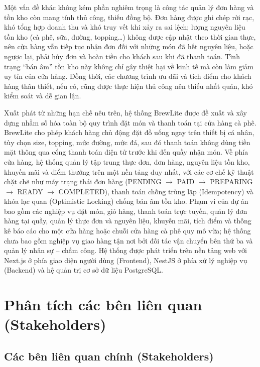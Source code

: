 \documentclass[12pt,a4paper]{report}
\begin{document}
Một vấn đề khác không kém phần nghiêm trọng là công tác quản lý đơn hàng và tồn kho còn mang tính thủ công, thiếu đồng bộ. Đơn hàng được ghi chép rời rạc, khó tổng hợp doanh thu và khó truy vết khi xảy ra sai lệch; lượng nguyên liệu tồn kho (cà phê, sữa, đường, topping\dots{}) không được cập nhật theo thời gian thực, nên cửa hàng vẫn tiếp tục nhận đơn đối với những món đã hết nguyên liệu, hoặc ngược lại, phải hủy đơn và hoàn tiền cho khách sau khi đã thanh toán. Tình trạng ``bán âm'' tồn kho này không chỉ gây thiệt hại về kinh tế mà còn làm giảm uy tín của cửa hàng. Đồng thời, các chương trình ưu đãi và tích điểm cho khách hàng thân thiết, nếu có, cũng được thực hiện thủ công nên thiếu nhất quán, khó kiểm soát và dễ gian lận.

Xuất phát từ những hạn chế nêu trên, hệ thống BrewLite được đề xuất và xây dựng nhằm số hóa toàn bộ quy trình đặt món và thanh toán tại cửa hàng cà phê. BrewLite cho phép khách hàng chủ động đặt đồ uống ngay trên thiết bị cá nhân, tùy chọn size, topping, mức đường, mức đá, sau đó thanh toán không dùng tiền mặt thông qua cổng thanh toán điện tử trước khi đến quầy nhận món. Về phía cửa hàng, hệ thống quản lý tập trung thực đơn, đơn hàng, nguyên liệu tồn kho, khuyến mãi và điểm thưởng trên một nền tảng duy nhất, với các cơ chế kỹ thuật chặt chẽ như máy trạng thái đơn hàng (PENDING $\rightarrow$ PAID $\rightarrow$ PREPARING $\rightarrow$ READY $\rightarrow$ COMPLETED), thanh toán chống trùng lặp (Idempotency) và khóa lạc quan (Optimistic Locking) chống bán âm tồn kho. Phạm vi của dự án bao gồm các nghiệp vụ đặt món, giỏ hàng, thanh toán trực tuyến, quản lý đơn hàng tại quầy, quản lý thực đơn và nguyên liệu, khuyến mãi, tích điểm và thống kê báo cáo cho một cửa hàng hoặc chuỗi cửa hàng cà phê quy mô vừa; hệ thống chưa bao gồm nghiệp vụ giao hàng tận nơi bởi đối tác vận chuyển bên thứ ba và quản lý nhân sự -- chấm công. Hệ thống được phát triển trên nền tảng web với Next.js ở phía giao diện người dùng (Frontend), NestJS ở phía xử lý nghiệp vụ (Backend) và hệ quản trị cơ sở dữ liệu PostgreSQL.

\section{Phân tích các bên liên quan (Stakeholders)}

\subsection{Các bên liên quan chính (Stakeholders)}
\end{document}
